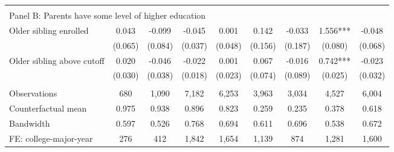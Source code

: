 {{\begin{tabular}{lcccccccc}
&  &  &  & & & & & &    \\
\multicolumn{9}{l}{Panel B: Parents have some level of higher education} \\
Older sibling enrolled&       0.043   &      -0.099   &      -0.045   &       0.001   &       0.142   &      -0.033   &       1.556***&      -0.048   \\
                    &     (0.065)   &     (0.084)   &     (0.037)   &     (0.048)   &     (0.156)   &     (0.187)   &     (0.080)   &     (0.068)   \\
 
Older sibling above cutoff&       0.020   &      -0.046   &      -0.022   &       0.001   &       0.067   &      -0.016   &       0.742***&      -0.023   \\
                    &     (0.030)   &     (0.038)   &     (0.018)   &     (0.023)   &     (0.074)   &     (0.089)   &     (0.025)   &     (0.032)   \\
                    &               &               &               &               &               &               &               &               \\
Observations        &         680   &       1,090   &       7,182   &       6,253   &       3,963   &       3,034   &       4,527   &       6,004   \\
Counterfactual mean &       0.975   &       0.938   &       0.896   &       0.823   &       0.259   &       0.235   &       0.378   &       0.618   \\
Bandwidth           &       0.597   &       0.526   &       0.768   &       0.694   &       0.611   &       0.696   &       0.538   &       0.672   \\
FE: college-major-year&         276   &         412   &       1,842   &       1,654   &       1,139   &         874   &       1,281   &       1,600   \\
 

\bottomrule
\end{tabular}
}
}
